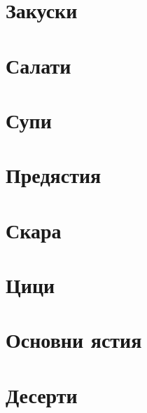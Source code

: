 \documentclass{article}
\begin{document}
\section{Закуски}
\section{Салати}
\section{Супи}
\section{Предястия}
\section{Скара}
\section{Цици}
\section{Основни ястия}
\section{Десерти}
\end{document}
